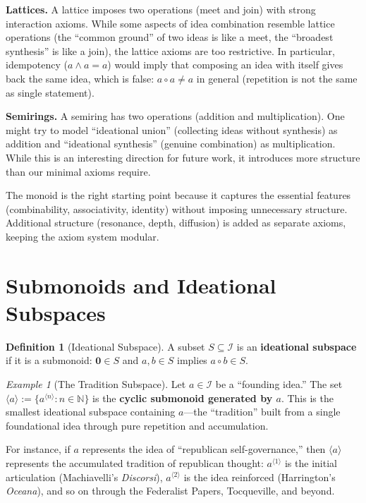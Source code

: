 \documentclass[11pt,openany]{book}
\theoremstyle{definition}
\newtheorem{definition}[axiom]{Definition}
\theoremstyle{plain}
\theoremstyle{remark}
\newtheorem{example}[axiom]{Example}
\newcommand{\IS}{\mathcal{I}}               %
\newcommand{\compose}{\circ}                 %
\newcommand{\void}{\mathbf{0}}              %
\newcommand{\compN}[2]{#1^{\langle #2 \rangle}} %
\begin{document}
\textbf{Lattices.} A lattice imposes two operations (meet and join) with strong interaction axioms. While some aspects of idea combination resemble lattice operations (the ``common ground'' of two ideas is like a meet, the ``broadest synthesis'' is like a join), the lattice axioms are too restrictive. In particular, idempotency ($a \wedge a = a$) would imply that composing an idea with itself gives back the same idea, which is false: $a \compose a \neq a$ in general (repetition is not the same as single statement).

\textbf{Semirings.} A semiring has two operations (addition and multiplication). One might try to model ``ideational union'' (collecting ideas without synthesis) as addition and ``ideational synthesis'' (genuine combination) as multiplication. While this is an interesting direction for future work, it introduces more structure than our minimal axioms require.

The monoid is the right starting point because it captures the essential features (combinability, associativity, identity) without imposing unnecessary structure. Additional structure (resonance, depth, diffusion) is added as separate axioms, keeping the axiom system modular.

\section{Submonoids and Ideational Subspaces}

\begin{definition}[Ideational Subspace]
A subset $S \subseteq \IS$ is an \textbf{ideational subspace} if it is a submonoid: $\void \in S$ and $a, b \in S$ implies $a \compose b \in S$.
\end{definition}

\begin{example}[The Tradition Subspace]
Let $a \in \IS$ be a ``founding idea.'' The set $\langle a \rangle := \{\compN{a}{n} : n \in \mathbb{N}\}$ is the \textbf{cyclic submonoid generated by $a$}. This is the smallest ideational subspace containing $a$---the ``tradition'' built from a single foundational idea through pure repetition and accumulation.

For instance, if $a$ represents the idea of ``republican self-governance,'' then $\langle a \rangle$ represents the accumulated tradition of republican thought: $\compN{a}{1}$ is the initial articulation (Machiavelli's \emph{Discorsi}), $\compN{a}{2}$ is the idea reinforced (Harrington's \emph{Oceana}), and so on through the Federalist Papers, Tocqueville, and beyond.
\end{example}
\end{document}
